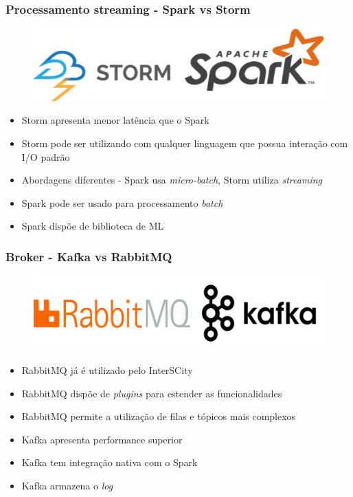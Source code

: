 \documentclass{beamer}
\begin{document}
  \begin{frame}
      \frametitle{Processamento streaming - Spark vs Storm}
      \begin{figure}
          \includegraphics[scale=0.6]{figures/StreamingProcessing.png}
      \end{figure}
      \begin{itemize}
          \item Storm apresenta menor latência que o Spark
          \item Storm pode ser utilizando com qualquer linguagem que possua
              interação com I/O padrão
          \item Abordagens diferentes - Spark usa \textit{micro-batch}, Storm utiliza
              \textit{streaming}
          \item Spark pode ser usado para processamento \textit{batch}
          \item Spark dispõe de biblioteca de ML
      \end{itemize}
  \end{frame}

  \begin{frame}
      \frametitle{Broker - Kafka vs RabbitMQ}
      \begin{figure}
          \includegraphics[scale=1]{figures/Brokers.png}
      \end{figure}
      \begin{itemize}
          \item RabbitMQ já é utilizado pelo InterSCity
          \item RabbitMQ dispõe de \textit{plugins} para estender as funcionalidades
          \item RabbitMQ permite a utilização de filas e tópicos mais complexos
          \item Kafka apresenta performance superior
          \item Kafka tem integração nativa com o Spark
          \item Kafka armazena o \textit{log}
      \end{itemize}
  \end{frame}
\end{document}
